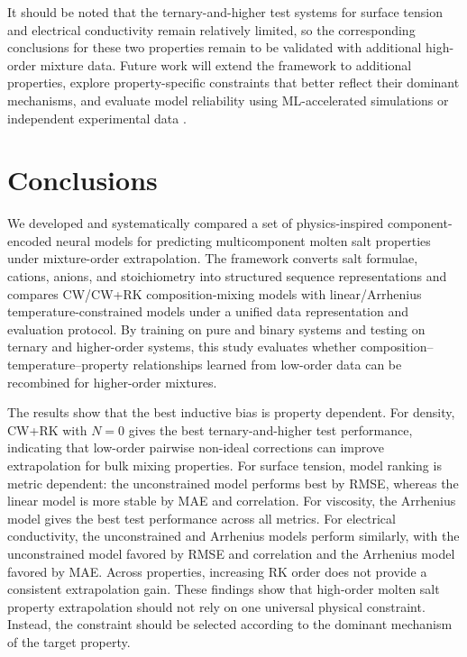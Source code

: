 \documentclass[journal=jctcce,manuscript=article,doi=true]{achemso}
\begin{document}
It should be noted that the ternary-and-higher test systems for surface tension and electrical conductivity remain relatively limited, so the corresponding conclusions for these two properties remain to be validated with additional high-order mixture data. Future work will extend the framework to additional properties, explore property-specific constraints that better reflect their dominant mechanisms, and evaluate model reliability using ML-accelerated simulations or independent experimental data \cite{gibson2025computing}.

\section{Conclusions}\label{sec:conclusions}

We developed and systematically compared a set of physics-inspired component-encoded neural models for predicting multicomponent molten salt properties under mixture-order extrapolation. The framework converts salt formulae, cations, anions, and stoichiometry into structured sequence representations and compares CW/CW+RK composition-mixing models with linear/Arrhenius temperature-constrained models under a unified data representation and evaluation protocol. By training on pure and binary systems and testing on ternary and higher-order systems, this study evaluates whether composition--temperature--property relationships learned from low-order data can be recombined for higher-order mixtures.

The results show that the best inductive bias is property dependent. For density, CW+RK with \(N=0\) gives the best ternary-and-higher test performance, indicating that low-order pairwise non-ideal corrections can improve extrapolation for bulk mixing properties. For surface tension, model ranking is metric dependent: the unconstrained model performs best by RMSE, whereas the linear model is more stable by MAE and correlation. For viscosity, the Arrhenius model gives the best test performance across all metrics. For electrical conductivity, the unconstrained and Arrhenius models perform similarly, with the unconstrained model favored by RMSE and correlation and the Arrhenius model favored by MAE. Across properties, increasing RK order does not provide a consistent extrapolation gain. These findings show that high-order molten salt property extrapolation should not rely on one universal physical constraint. Instead, the constraint should be selected according to the dominant mechanism of the target property.
\end{document}
